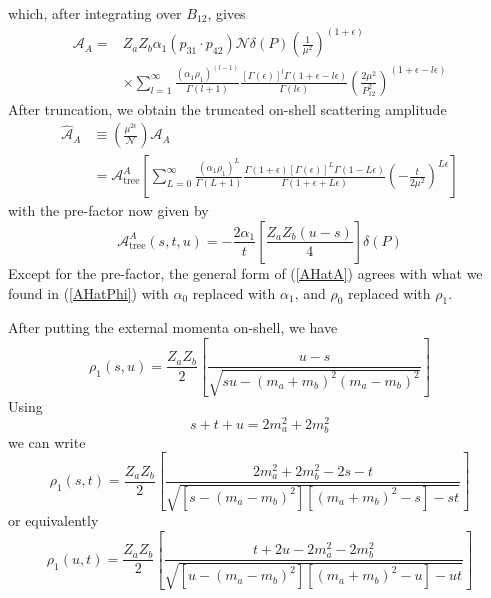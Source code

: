which, after integrating over $B_{12}$, gives
\begin{equation}
\begin{split}
	\mathcal{A}_{A} = {}& Z_{a} Z_{b} \alpha_{1} \left( p_{31} \cdot p_{42} \right) \mathcal{N} \delta(P) \left(\frac{1}{\mu^{2}} \right)^{(1 + \epsilon)} \\
	&\times \sum_{l = 1}^{\infty} \frac{\left(\alpha_{1} \rho_{1} \right)^{(l - 1)}}{\Gamma(l + 1)} \frac{[\Gamma(\epsilon)]^{l} \Gamma(1 + \epsilon - l \epsilon)}{\Gamma(l \epsilon)} \left(\frac{2\mu^{2}}{P_{12}^{2}} \right)^{(1 + \epsilon - l \epsilon)}
\end{split}
\end{equation}
After truncation, we obtain the truncated on-shell scattering amplitude
\begin{align}
	\widehat{\mathcal{A}}_{A} &\equiv \left(\frac{\mu^{2\epsilon}}{\mathcal{N}} \right) \mathcal{A}_{A} \nonumber \\
	&= \mathcal{A}_{\text{tree}}^{A} \left[ \sum_{L = 0}^{\infty} \frac{\left(\alpha_{1} \rho_{1} \right)^{L}}{\Gamma(L + 1)} \frac{\Gamma(1 + \epsilon) [\Gamma(\epsilon)]^{L} \Gamma(1 - L \epsilon)}{\Gamma(1 + \epsilon + L \epsilon)} \left( -\frac{t}{2 \mu^{2}} \right)^{L \epsilon} \right] \label{AHatA}
\end{align}
with the pre-factor now given by
\begin{equation}
	\mathcal{A}_{\text{tree}}^{A}(s, t, u) = - \frac{2 \alpha_{1}}{t} \left[ \frac{Z_{a} Z_{b} (u - s)}{4} \right] \delta(P)
\end{equation}
Except for the pre-factor, the general form of (\ref{AHatA}) agrees with what we found in (\ref{AHatPhi}) with $\alpha_{0}$ replaced with $\alpha_{1}$, and $\rho_{0}$ replaced with $\rho_{1}$.

After putting the external momenta on-shell, we have
\begin{equation}
	\rho_{1}(s, u) = \frac{Z_{a} Z_{b}}{2} \left[ \frac{u - s}{\sqrt{s u - (m_{a} + m_{b})^{2} (m_{a} - m_{b})^{2}}} \right] \label{rho1su}
\end{equation}
Using
\begin{equation}
	s + t + u = 2m_{a}^{2} + 2m_{b}^{2}
\end{equation}
we can write
\begin{equation}
	\rho_{1}(s, t) = \frac{Z_{a} Z_{b}}{2} \left[ \frac{2m_{a}^{2} + 2m_{b}^{2} - 2s - t}{\sqrt{[s - (m_{a} - m_{b})^{2}] [(m_{a} + m_{b})^{2} - s] - s t}} \right] \label{rho1st}
\end{equation}
or equivalently
\begin{equation}
	\rho_{1}(u, t) = \frac{Z_{a} Z_{b}}{2} \left[ \frac{t + 2u - 2m_{a}^{2} - 2m_{b}^{2}}{\sqrt{[u - (m_{a} - m_{b})^{2}] [(m_{a} + m_{b})^{2} - u] - u t}} \right] \label{rho1ut}
\end{equation}
